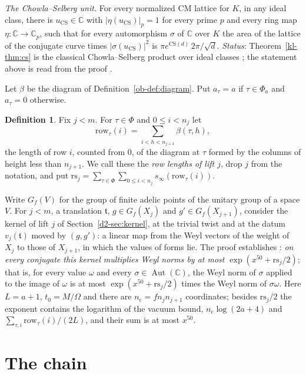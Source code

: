 \documentclass[reqno]{amsart}
\theoremstyle{definition}
\newtheorem{definition}[problem]{Definition}
\theoremstyle{plain}
\theoremstyle{remark}
\newcommand{\C}{\mathbb{C}}
\newcommand{\sinf}{s_\infty}
\newcommand{\row}{\mathrm{row}}
\newcommand{\tr}{\mathfrak t}
\newcommand{\Aut}{\operatorname{Aut}}
\newcommand{\rs}{\mathrm{rs}}
\begin{document}
\emph{The Chowla--Selberg unit.}  For every normalized CM lattice for \(K\), in any ideal class, there is \(u_{\mathrm{CS}} \in \C\) with \(\lvert\eta(u_{\mathrm{CS}})\rvert_p = 1\) for every prime \(p\) and every ring map \(\eta\colon \C \to \C_p\), such that for every automorphism \(\sigma\) of \(\C\) over \(K\) the area of the lattice of the conjugate curve times \(\lvert\sigma(u_{\mathrm{CS}})\rvert^2\) is \(\pi e^{\mathrm{CS}(d)}\,2\pi/\sqrt d\).  \emph{Status}: Theorem~\ref{kl-thm:cs} is the classical Chowla--Selberg product over ideal classes \cite{CS}; the statement above is read from the proof \cite{GL}.

Let \(\beta\) be the diagram of Definition~\ref{ob-def:diagram}.  Put \(a_\tau = a\) if \(\tau \in \Phi_a\) and \(a_\tau = 0\) otherwise.

\begin{definition}\label{def:rows}
Fix \(j < m\).  For \(\tau \in \Phi\) and \(0 \le i < n_j\) let
\[
  \row_\tau(i) = \sum_{i < h < n_{j+1}} \beta(\tau, h),
\]
the length of row \(i\), counted from \(0\), of the diagram at \(\tau\) formed by the columns of height less than \(n_{j+1}\).  We call these the \emph{row lengths of lift \(j\)}, drop \(j\) from the notation, and put \(\rs_j = \sum_{\tau \in \Phi}\sum_{0 \le i < n_j}\sinf(\row_\tau(i))\).
\end{definition}

Write \(G_f(V)\) for the group of finite adelic points of the unitary group of a space \(V\).  For \(j < m\), a translation \(\tr\), \(g \in G_f(X_j)\) and \(g' \in G_f(X_{j+1})\), consider the kernel of lift \(j\) of Section~\ref{d2-sec:kernel}, at the trivial twist and at the datum \(v_j(\tr)\) moved by \((g, g')\): a linear map from the Weyl vectors of the weight of \(X_j\) to those of \(X_{j+1}\), in which the values of forms lie.  The proof establishes \cite{GL}: \emph{on every conjugate this kernel multiplies Weyl norms by at most \(\exp(x^{50} + \rs_j/2)\)}; that is, for every value \(\omega\) and every \(\sigma \in \Aut(\C)\), the Weyl norm of \(\sigma\) applied to the image of \(\omega\) is at most \(\exp(x^{50} + \rs_j/2)\) times the Weyl norm of \(\sigma\omega\).  Here \(L = a + 1\), \(t_0 = M/\Omega\) and there are \(n_{\mathrm{c}} = fn_jn_{j+1}\) coordinates; besides \(\rs_j/2\) the exponent contains the logarithm of the vacuum bound, \(n_{\mathrm{c}}\log(2a + 4)\) and \(\sum_{\tau,i}\row_\tau(i)/(2L)\), and their sum is at most \(x^{50}\).

\section{The chain}\label{sec:chain}
\end{document}
